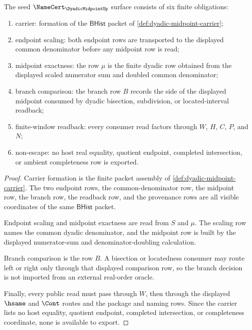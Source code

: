 \begin{theorem}
\label{thm:dyadic-midpoint-namecert-obligations}
The seed $\NameCert_{\DyadicMidpointUp}$ surface consists of six finite obligations:
\begin{enumerate}
\item carrier: formation of the $\mathsf{BHist}$ packet of \autoref{def:dyadic-midpoint-carrier};
\item endpoint scaling: both endpoint rows are transported to the displayed common denominator before any midpoint row is read;
\item midpoint exactness: the row $\mu$ is the finite dyadic row obtained from the displayed scaled numerator sum and doubled common denominator;
\item branch comparison: the branch row $B$ records the side of the displayed midpoint consumed by dyadic bisection, subdivision, or located-interval readback;
\item finite-window readback: every consumer read factors through $W$, $H$, $C$, $P$, and $N$;
\item non-escape: no host real equality, quotient endpoint, completed intersection, or ambient completeness row is exported.
\end{enumerate}
\end{theorem}
\begin{proof}
Carrier formation is the finite packet assembly of \autoref{def:dyadic-midpoint-carrier}. The two endpoint rows, the common-denominator row, the midpoint row, the branch row, the readback row, and the provenance rows are all visible coordinates of the same $\mathsf{BHist}$ packet.

Endpoint scaling and midpoint exactness are read from $S$ and $\mu$. The scaling row names the common dyadic denominator, and the midpoint row is built by the displayed numerator-sum and denominator-doubling calculation.

Branch comparison is the row $B$. A bisection or locatedness consumer may route left or right only through that displayed comparison row, so the branch decision is not imported from an external real-order oracle.

Finally, every public read must pass through $W$, then through the displayed $\hsame$ and $\Cont$ routes and the package and naming rows. Since the carrier lists no host equality, quotient endpoint, completed intersection, or completeness coordinate, none is available to export.
\end{proof}

